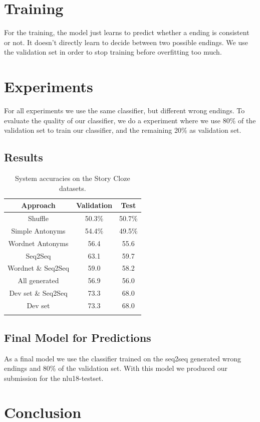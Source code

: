 \documentclass{article}
\begin{document}
\section{Training}
For the training, the model just learns to predict whether a ending is consistent or not. It doesn't directly learn to decide between two possible endings. We use the validation set in order to stop training before overfitting too much.

\section{Experiments}
For all experiments we use the same classifier, but different wrong endings. To evaluate the quality of our classifier, we do a experiment where we use 80\% of the validation set to train our classifier, and the remaining 20\% as validation set.

\subsection{Results}
\begin{table}[h]
  \centering
  \begin{tabular}{ c c c}
    \toprule
    Approach & Validation & Test \\
    \midrule
    Shuffle & 50.3\% & 50.7\%\\
    Simple Antonyms & 54.4\% & 49.5\%\\
    Wordnet Antonyms & 56.4 & 55.6\\
    Seq2Seq & 63.1 & 59.7\\
    Wordnet \& Seq2Seq & 59.0 & 58.2\\
    All generated & 56.9 & 56.0\\
    Dev set \& Seq2Seq & 73.3 & 68.0\\
    Dev set & 73.3 & 68.0\\

    \bottomrule
    \\
  \end{tabular}
  \label{Tab:results}
  \caption{System accuracies on the Story Cloze datasets. }
\end{table}

\subsection{Final Model for Predictions}

As a final model we use the classifier trained on the seq2seq generated wrong endings and 80\% of the validation set. With this model we produced our submission for the nlu18-testset.

\section{Conclusion}





\end{document}

